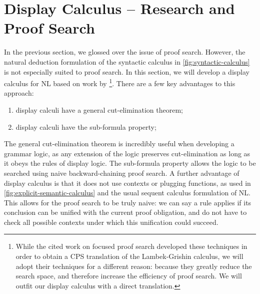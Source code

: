 \documentclass[a4paper]{article}
\begin{document}
\section{Display Calculus -- Research and Proof Search}\label{sec:display-calculus}
In the previous section, we glossed over the issue of proof
search. However, the natural deduction formulation of the syntactic
calculus in \autoref{fig:syntactic-calculus} is not especially suited
to proof search.
In this section, we will develop a display calculus
\citep{belnap1982} for NL based on work by
\citet{bernardi2010,bastenhof2012}\footnote{%
  While the cited work on focused proof search developed these
  techniques in order to obtain a CPS translation of the
  Lambek-Grishin calculus, we will adopt their techniques for a
  different reason: because they greatly reduce the search space, and
  therefore increase the efficiency of proof search. We will outfit
  our display calculus with a direct translation.
}. There are a few key advantages to this approach:
\begin{enumerate}
\item display calculi have a general cut-elimination theorem;
\item display calculi have the sub-formula property;
\end{enumerate}
The general cut-elimination theorem is incredibly useful when
developing a grammar logic, as any extension of the logic preserves
cut-elimination as long as it obeys the rules of display logic.
The sub-formula property allows the logic to be searched using naive
backward-chaining proof search. A further advantage of display
calculus is that it does not use contexts or plugging functions, as
used in \autoref{fig:explicit-semantic-calculus} and the usual sequent
calculus formulation of NL. This allows for the proof search to be
truly naive: we can say a rule applies if its conclusion can be
unified with the current proof obligation, and do not have to check
all possible contexts under which this unification could succeed.










\end{document}
